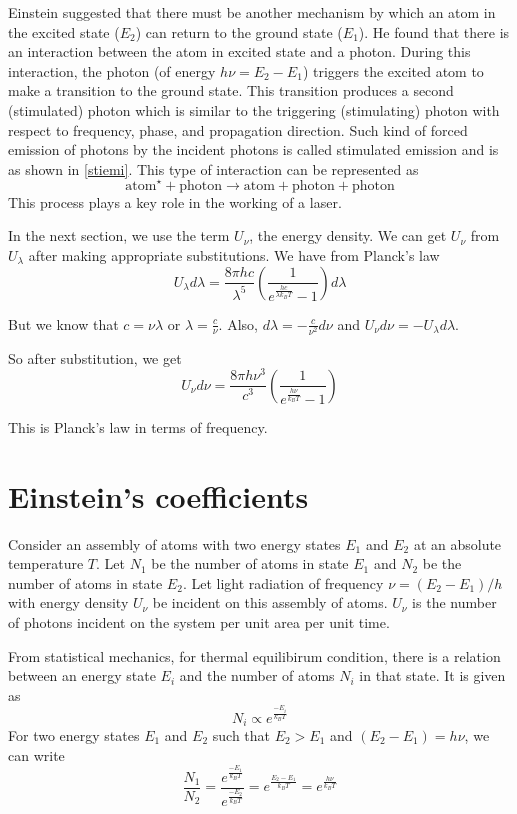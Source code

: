 \documentclass[12pt]{article}
\begin{document}
Einstein suggested that there must be another mechanism by which an atom in the excited state (\(E_2\)) can return to the ground state (\(E_1\)). He found that there is an interaction between the atom in excited state and a photon. During this interaction, the photon (of energy \(h\nu=E_2-E_1\)) triggers the excited atom to make a transition to the ground state. This transition produces a second (stimulated) photon which is similar to the triggering (stimulating) photon with respect to frequency, phase, and propagation direction. Such kind of forced emission of photons by the incident photons is called stimulated emission and is as shown in \ref{stiemi}. This type of interaction can be represented as
\[\text{atom}^{\star} + \text{photon} \rightarrow \text{atom} + \text{photon} + \text{photon}\]
This process plays a key role in the working of a laser.

\vspace{0.5cm}
In the next section, we use the term \(U_\nu\), the energy density. We can get \(U_\nu\) from \(U_\lambda\) after making appropriate substitutions. We have from Planck's law
\[U_\lambda d\lambda=\frac{8\pi hc}{\lambda^5}\left(\frac{1}{e^{\textstyle \frac{hc}{\lambda k_BT}}-1}\right)d\lambda\]

But we know that \(c=\nu\lambda\) or \(\displaystyle \lambda=\frac{c}{\nu}\).
Also, \(\displaystyle d\lambda = -\frac{c}{\nu^2}d\nu\) and \(U_\nu d\nu=-U_\lambda d\lambda\).

So after substitution, we get
\[U_\nu d\nu=\frac{8\pi h\nu^3}{c^3}\left(\frac{1}{e^{\textstyle \frac{h\nu}{k_BT}}-1}\right)\]

This is Planck's law in terms of frequency.

\section{Einstein's coefficients}
Consider an assembly of atoms with two energy states \(E_1\) and \(E_2\) at an absolute temperature \(T\). Let \(N_1\) be the number of atoms in state \(E_1\) and \(N_2\) be the number of atoms in state \(E_2\). Let light radiation of frequency \(\nu=(E_2-E_1)/h\) with energy density \(U_\nu\) be incident on this assembly of atoms. \(U_\nu\) is the number of photons incident on the system per unit area per unit time.

From statistical mechanics, for thermal equilibirum condition, there is a relation between an energy state \(E_i\) and the number of atoms \(N_i\) in that state. It is given as
\[N_i \propto e^{\frac{-E_i}{k_BT}}\]
For two energy states \(E_1\) and \(E_2\) such that \(E_2 > E_1\) and \((E_2-E_1)=h\nu\), we can write
\[\frac{N_1}{N_2}=\frac{e^{\frac{-E_1}{k_BT}}}{e^{\frac{-E_2}{k_BT}}}=e^{\frac{E_2-E_1}{k_BT}}=e^{\frac{h\nu}{k_BT}}\]
\end{document}
